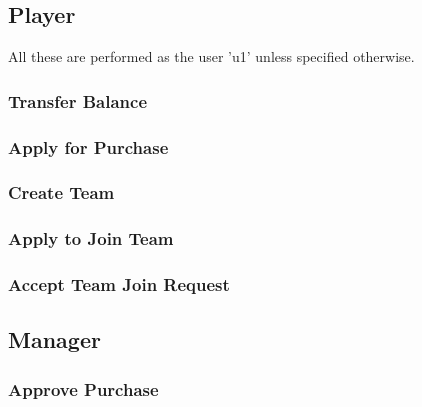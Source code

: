 \subsection{Player}

All these are performed as the user 'u1' unless specified otherwise.


\subsubsection{Transfer Balance}

\subsubsection{Apply for Purchase}

\subsubsection{Create Team}

\subsubsection{Apply to Join Team}

\subsubsection{Accept Team Join Request}


\subsection{Manager}

\subsubsection{Approve Purchase}
